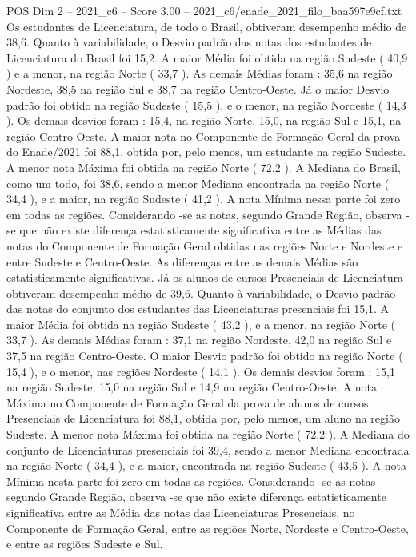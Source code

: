 \begin{textsample}{POS Dim 2 – 2021\_c6 – Score 3.00 – 2021\_c6/enade\_2021\_filo\_baa597e9cf.txt}
Os estudantes de Licenciatura, de todo o Brasil, obtiveram desempenho médio de 38,6.
Quanto à variabilidade, o Desvio padrão das notas dos estudantes de Licenciatura do Brasil foi 15,2.
A maior Média foi obtida na região Sudeste ( 40,9 ) e a menor, na região Norte ( 33,7 ).
As demais Médias foram : 35,6 na região Nordeste, 38,5 na região Sul e 38,7 na região Centro-Oeste.
Já o maior Desvio padrão foi obtido na região Sudeste ( 15,5 ), e o menor, na região Nordeste ( 14,3 ).
Os demais desvios foram : 15,4, na região Norte, 15,0, na região Sul e 15,1, na região Centro-Oeste.
A maior nota no Componente de Formação Geral da prova do Enade/2021 foi 88,1, obtida por, pelo menos, um estudante na região Sudeste.
A menor nota Máxima foi obtida na região Norte ( 72,2 ).
A Mediana do Brasil, como um todo, foi 38,6, sendo a menor Mediana encontrada na região Norte ( 34,4 ), e a maior, na região Sudeste ( 41,2 ).
A nota Mínima nessa parte foi zero em todas as regiões.
Considerando -se as notas, segundo Grande Região, observa -se que não existe diferença estatisticamente significativa entre as Médias das notas do Componente de Formação Geral obtidas nas regiões Norte e Nordeste e entre Sudeste e Centro-Oeste.
As diferenças entre as demais Médias são estatisticamente significativas.
Já os alunos de cursos Presenciais de Licenciatura obtiveram desempenho médio de 39,6.
Quanto à variabilidade, o Desvio padrão das notas do conjunto dos estudantes das Licenciaturas presenciais foi 15,1.
A maior Média foi obtida na região Sudeste ( 43,2 ), e a menor, na região Norte ( 33,7 ).
As demais Médias foram : 37,1 na região Nordeste, 42,0 na região Sul e 37,5 na região Centro-Oeste.
O maior Desvio padrão foi obtido na região Norte ( 15,4 ), e o menor, nas regiões Nordeste ( 14,1 ).
Os demais desvios foram : 15,1 na região Sudeste, 15,0 na região Sul e 14,9 na região Centro-Oeste.
A nota Máxima no Componente de Formação Geral da prova de alunos de cursos Presenciais de Licenciatura foi 88,1, obtida por, pelo menos, um aluno na região Sudeste.
A menor nota Máxima foi obtida na região Norte ( 72,2 ).
A Mediana do conjunto de Licenciaturas presenciais foi 39,4, sendo a menor Mediana encontrada na região Norte ( 34,4 ), e a maior, encontrada na região Sudeste ( 43,5 ).
A nota Mínima nesta parte foi zero em todas as regiões.
Considerando -se as notas segundo Grande Região, observa -se que não existe diferença estatisticamente significativa entre as Média das notas das Licenciaturas Presenciais, no Componente de Formação Geral, entre as regiões Norte, Nordeste e Centro-Oeste, e entre as regiões Sudeste e Sul.

\end{textsample}
